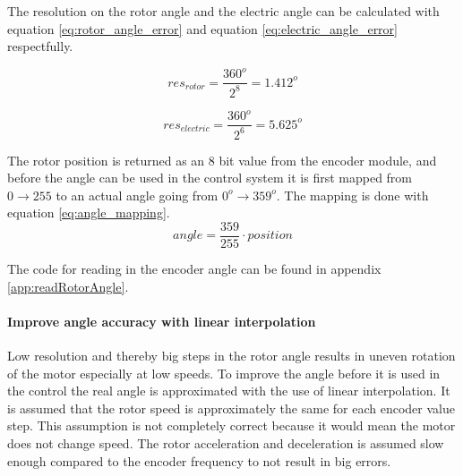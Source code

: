 The resolution on the rotor angle and the electric angle can be calculated with equation \ref{eq:rotor_angle_error} and equation \ref{eq:electric_angle_error} respectfully. 

\begin{equation}
res_{rotor} = \frac{360^o}{2^8} = 1.412^o
\label{eq:rotor_angle_error}
\end{equation}

\begin{equation}
res_{electric} = \frac{360^o}{2^6} = 5.625^o
\label{eq:electric_angle_error}
\end{equation}




The rotor position is returned as an 8 bit value from the encoder module, and before the angle can be used in the control system it is first mapped from $0 \rightarrow 255$ to an actual angle going from $0^o \rightarrow 359^o$. The mapping is done with equation \ref{eq:angle_mapping}.
\begin{equation}
    angle = \frac{359}{255} \cdot position
    \label{eq:angle_mapping}
\end{equation}

The code for reading in the encoder angle can be found in appendix \ref{app:readRotorAngle}.




\paragraph{Improve angle accuracy with linear interpolation}
\label{sec:linear_interpolation}
Low resolution and thereby big steps in the rotor angle results in uneven rotation of the motor especially at low speeds.
To improve the angle before it is used in the control the real angle is approximated with the use of linear interpolation. It is assumed that the rotor speed is approximately the same for each encoder value step. This assumption is not completely correct because it would mean the motor does not change speed. The rotor acceleration and deceleration is assumed slow enough compared to the encoder frequency to not result in big errors.


